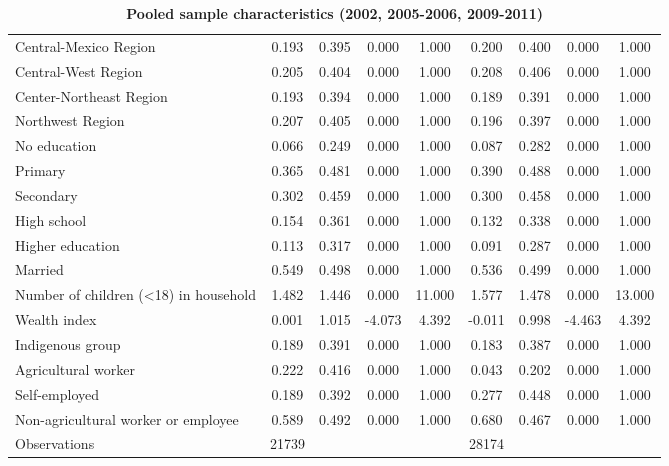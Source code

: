 \begin{table}[h]
\begin{center}
\begin{adjustbox}{max width=\textwidth}
{\begin{tabular}{l*{2}{cccc}}
Central-Mexico Region&       0.193&       0.395&       0.000&       1.000&       0.200&       0.400&       0.000&       1.000\\
Central-West Region &       0.205&       0.404&       0.000&       1.000&       0.208&       0.406&       0.000&       1.000\\
Center-Northeast Region&       0.193&       0.394&       0.000&       1.000&       0.189&       0.391&       0.000&       1.000\\
Northwest Region    &       0.207&       0.405&       0.000&       1.000&       0.196&       0.397&       0.000&       1.000\\
No education        &       0.066&       0.249&       0.000&       1.000&       0.087&       0.282&       0.000&       1.000\\
Primary             &       0.365&       0.481&       0.000&       1.000&       0.390&       0.488&       0.000&       1.000\\
Secondary           &       0.302&       0.459&       0.000&       1.000&       0.300&       0.458&       0.000&       1.000\\
High school         &       0.154&       0.361&       0.000&       1.000&       0.132&       0.338&       0.000&       1.000\\
Higher education    &       0.113&       0.317&       0.000&       1.000&       0.091&       0.287&       0.000&       1.000\\
Married             &       0.549&       0.498&       0.000&       1.000&       0.536&       0.499&       0.000&       1.000\\
Number of children (<18) in household&       1.482&       1.446&       0.000&      11.000&       1.577&       1.478&       0.000&      13.000\\
Wealth index        &       0.001&       1.015&      -4.073&       4.392&      -0.011&       0.998&      -4.463&       4.392\\
Indigenous group    &       0.189&       0.391&       0.000&       1.000&       0.183&       0.387&       0.000&       1.000\\
Agricultural worker &       0.222&       0.416&       0.000&       1.000&       0.043&       0.202&       0.000&       1.000\\
Self-employed       &       0.189&       0.392&       0.000&       1.000&       0.277&       0.448&       0.000&       1.000\\
Non-agricultural worker or employee&       0.589&       0.492&       0.000&       1.000&       0.680&       0.467&       0.000&       1.000\\
\midrule
Observations        &       21739&            &            &            &       28174&            &            &            \\
\bottomrule
\end{tabular}%
}
\end{adjustbox}
\end{center}
\caption{\label{tab:Pooled-sample-characteristics}\textbf{Pooled sample characteristics
(2002, 2005-2006, 2009-2011) }}
\end{table}


